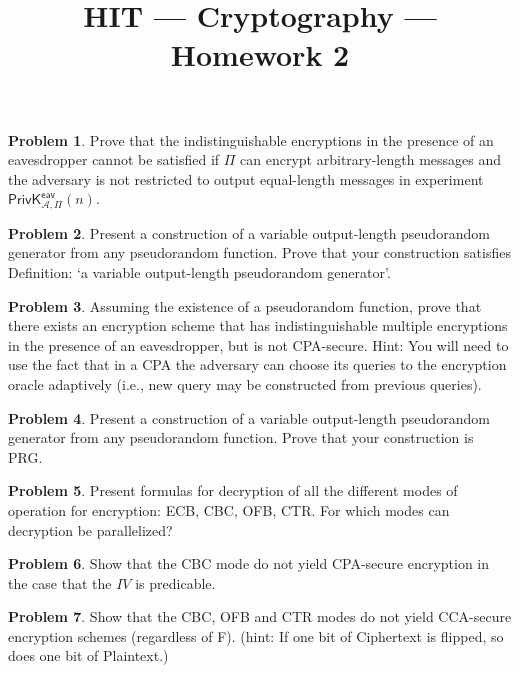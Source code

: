 \documentclass[11pt]{article}
\title{HIT --- Cryptography --- Homework 2}
\theoremstyle{definition}
\newtheorem{problem}{Problem}
\begin{document}
\maketitle

\begin{problem}
Prove that the indistinguishable encryptions in the presence of an eavesdropper cannot be satisfied if $\Pi$ can encrypt arbitrary-length messages and the adversary is not restricted to output equal-length messages in experiment $\mathsf{PrivK}^{\mathsf{eav}}_{\mathcal{A},\Pi}(n)$.
\end{problem}

\begin{problem}
Present a construction of a variable output-length pseudorandom generator from any pseudorandom function. Prove that your construction satisfies Definition: `a variable output-length pseudorandom generator'.
\end{problem}

\begin{problem}
Assuming the existence of a pseudorandom function, prove that there exists an encryption scheme that has indistinguishable multiple encryptions in the presence of an eavesdropper, but is not CPA-secure.
{\small Hint: You will need to use the fact that in a CPA the adversary can choose its queries to the encryption oracle adaptively (i.e., new query may be constructed from previous queries).}
\end{problem}

\begin{problem}
Present a construction of a variable output-length pseudorandom generator from any pseudorandom function. Prove that your construction is PRG.
\end{problem}

\begin{problem}
Present formulas for decryption of all the different modes of operation for encryption: ECB, CBC, OFB, CTR. For which modes can decryption be parallelized?
\end{problem}

\begin{problem}
Show that the CBC mode do not yield CPA-secure encryption in the case that the $IV$ is predicable.
\end{problem}

\begin{problem}
Show that the CBC, OFB and CTR modes do not yield CCA-secure encryption schemes (regardless of F). (hint: If one bit of Ciphertext is flipped, so does one bit of Plaintext.)
\end{problem}
\end{document}
